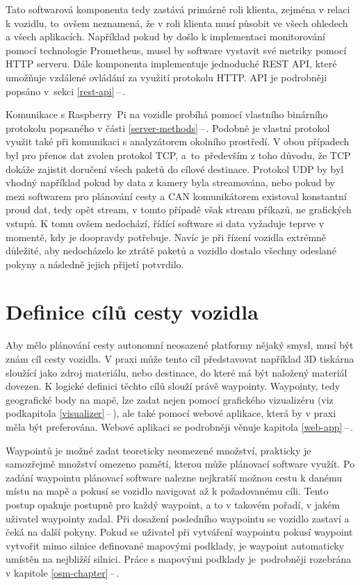 \documentclass[czech, bachelor]{diploma}
\newcommand{\peteref}[1]{\ref{#1}\,--\,\nameref{#1}}
\begin{document}
Tato softwarová komponenta tedy zastává primárně roli klienta, zejména v relaci k vozidlu, to~ovšem neznamená, že v roli klienta
musí působit ve všech ohledech a všech aplikacích. Například pokud by došlo k implementaci monitorování pomocí technologie
Prometheus\cite{prometheus-source}, musel by software vystavit své metriky pomocí HTTP serveru. Dále komponenta implementuje
jednoduché REST API, které umožňuje vzdálené ovládání za využití protokolu HTTP. API je podrobněji popsáno v~sekci
\peteref{rest-api}.

Komunikace s Raspberry~Pi na vozidle probíhá pomocí vlastního binárního protokolu popsaného v části \peteref{server-methods}.
Podobně je vlastní protokol využit také při komunikaci s analyzátorem okolního prostředí. V obou případech byl pro přenos dat
zvolen protokol TCP, a~to~především z toho důvodu, že TCP dokáže zajistit doručení všech paketů do cílové destinace\cite{
tcp-source}. Protokol UDP\cite{udp-source} by byl vhodný například pokud by data z kamery byla streamována, nebo pokud by mezi
softwarem pro plánování cesty a CAN komunikátorem existoval konstantní proud dat, tedy opět stream, v tomto případě však stream
příkazů, ne grafických vstupů. K tomu ovšem nedochází, řídící software si data vyžaduje teprve v momentě, kdy je doopravdy
potřebuje. Navíc je při řízení vozidla extrémně důležité, aby nedocházelo ke ztrátě paketů a vozidlo dostalo všechny odeslané
pokyny a následně jejich přijetí potvrdilo.

\section{Definice cílů cesty vozidla} \label{target-definition}

Aby mělo plánování cesty autonomní neosazené platformy nějaký smysl, musí být znám cíl cesty vozidla. V praxi může tento cíl
představovat například 3D tiskárna sloužící jako zdroj materiálu, nebo destinace, do které má být naložený materiál dovezen.
K logické definici těchto cílů slouží právě waypointy. Waypointy, tedy geografické body na mapě, lze zadat nejen pomocí grafického
vizualizéru (viz podkapitola \peteref{visualizer}), ale také pomocí webové aplikace, která by v praxi měla být preferována.
Webové aplikaci se podrobněji věnuje kapitola \peteref{web-app}.

Waypointů je možné zadat teoreticky neomezené množství, prakticky je samozřejmě množství omezeno pamětí, kterou může plánovací
software využít. Po zadání waypointu plánovací software nalezne nejkratší možnou cestu k danému místu na mapě a pokusí se vozidlo
navigovat až k požadovanému cíli. Tento postup opakuje postupně pro každý waypoint, a to v takovém pořadí, v jakém uživatel
waypointy zadal. Při dosažení posledního waypointu se vozidlo zastaví a čeká na další pokyny. Pokud se uživatel při vytváření
waypointu pokusí waypoint vytvořit mimo silnice definované mapovými podklady, je waypoint automaticky umístěn na nejbližší
silnici. Práce s mapovými podklady je~podrobněji rozebrána v kapitole \peteref{osm-chapter}.
\end{document}
